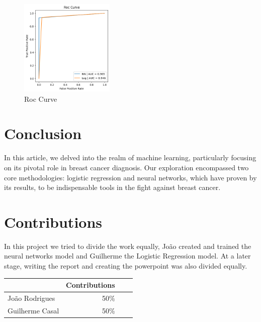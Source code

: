 \documentclass[12pt,a4paper,twocolumn]{article}
\begin{document}
\begin{figure}[H]
\includegraphics[width=0.4\textwidth]{images/roc.png}
\centering
\caption{\label{fig:roc} Roc Curve}
\end{figure}

\section{Conclusion}
In this article, we delved into the realm of machine learning, particularly focusing on its pivotal role in breast cancer diagnosis. Our exploration encompassed two core methodologies: logistic regression and neural networks, which have proven by its results, to be indispensable tools in the fight against breast cancer. 

\section{Contributions}
In this project we tried to divide the work equally, João created and trained the neural networks model and Guilherme the Logistic Regression model. At a later stage, writing the report and creating the powerpoint was also divided equally.

\begin{table}[h!]
\begin{tabular}{lrrr}
\toprule
{} &       Contributions \\
\midrule
João Rodrigues	& 50\% \\
Guilherme Casal & 50\% \\
\bottomrule
\end{tabular}
    
\end{table}


\nocite{Paper5,Paper1,Paper3,sklearn,mastromichalakis2021alrelu,misc_breast_cancer,Paper4,tensorflow,roc} 
\printbibliography

\end{document}
